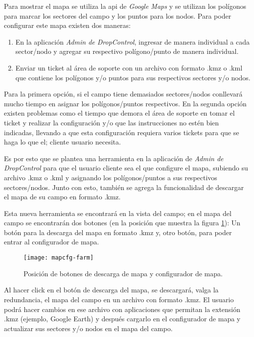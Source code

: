 Para mostrar el mapa se utiliza la api de \textit{Google Maps} y se utilizan los polígonos para marcar los sectores del campo y los puntos para los nodos.
Para poder configurar este mapa existen dos maneras:
\begin{enumerate}
    \item En la aplicación \textit{Admin de DropControl}, ingresar de manera individual a cada sector/nodo y agregar su respectivo polígono/punto de manera individual.
    \item Enviar un ticket al área de soporte con un archivo con formato .kmz o .kml que contiene los polígonos y/o puntos para sus respectivos sectores y/o nodos.
\end{enumerate}
Para la primera opción, si el campo tiene demasiados sectores/nodos conllevará mucho tiempo en asignar los polígonos/puntos respectivos.
En la segunda opción existen problemas como el tiempo que demora el área de soporte en tomar el ticket y realizar la configuración y/o
que las instrucciones no estén bien indicadas, llevando a que esta configuración requiera varios tickets para que se haga lo que el; cliente usuario necesita.

Es por esto que se plantea una herramienta en la aplicación de \textit{Admin de DropControl} para que el usuario cliente sea el que
configure el mapa, subiendo su archivo .kmz o .kml y asignando los polígonos/puntos a sus respectivos sectores/nodos.
Junto con esto, también se agrega la funcionalidad de descargar el mapa de su campo en formato .kmz.

Esta nueva herramienta se encontrará en la vista del campo; en el mapa del campo se encontrarán dos botones (en la posición que muestra la figura \ref{fig:mapcfg-farm}): Un botón para la descarga del mapa en formato .kmz y, otro botón, para poder entrar al configurador de mapa.

\begin{figure}[H]
	\centering
	\texttt{[image: mapcfg-farm]}
	\caption{\label{fig:mapcfg-farm} Posición de botones de descarga de mapa y configurador de mapa.}
\end{figure}

Al hacer click en el botón de descarga del mapa, se descargará, valga la redundancia, el mapa del campo en un archivo con formato .kmz. El usuario podrá hacer cambios en ese archivo con aplicaciones que permitan la extensión .kmz (ejemplo, Google Earth) y después cargarlo en el configurador de mapa y actualizar sus sectores y/o nodos en el mapa del campo.

